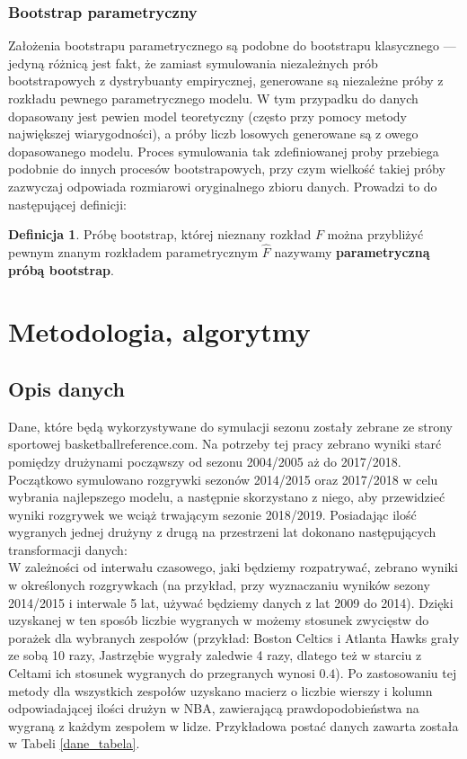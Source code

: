 \documentclass[inzynierska]{pwr_wmat_praca_dyplomowa}
\theoremstyle{plain}
\numberwithin{theorem}{chapter}
\theoremstyle{definition}
\numberwithin{theorem}{chapter}
\newtheorem{definition}[theorem]{Definicja}
\begin{document}
\subsection{Bootstrap parametryczny}
Założenia bootstrapu parametrycznego są podobne do bootstrapu klasycznego --- jedyną różnicą jest fakt, że zamiast symulowania niezależnych prób bootstrapowych z dystrybuanty empirycznej, generowane są niezależne próby z rozkładu pewnego parametrycznego modelu. 
W tym przypadku do danych dopasowany jest pewien model teoretyczny (często przy pomocy metody największej wiarygodności), a próby liczb losowych generowane są z owego dopasowanego modelu. Proces symulowania tak zdefiniowanej proby przebiega podobnie do innych procesów bootstrapowych, przy czym wielkość takiej próby zazwyczaj odpowiada rozmiarowi oryginalnego zbioru danych. Prowadzi to do następującej definicji:
\begin{definition}
	Próbę bootstrap, której nieznany rozkład $F$ można przybliżyć pewnym znanym rozkładem parametrycznym $\hat{F}$ nazywamy \textbf{parametryczną próbą bootstrap}. 
\end{definition}
 
\chapter{Metodologia, algorytmy}\label{rodzial_algorytmy}
\section{Opis danych}
Dane, które będą wykorzystywane do symulacji sezonu zostały zebrane ze strony sportowej basketballreference.com.
Na potrzeby tej pracy zebrano wyniki starć pomiędzy drużynami począwszy od sezonu 2004/2005 aż do 2017/2018. Początkowo symulowano rozgrywki sezonów 2014/2015 oraz 2017/2018 w celu wybrania najlepszego modelu, a następnie skorzystano z niego, aby przewidzieć wyniki rozgrywek we wciąż trwającym sezonie 2018/2019.
Posiadając ilość wygranych jednej drużyny z drugą na przestrzeni lat dokonano następujących transformacji danych:
\\
W zależności od interwału czasowego, jaki będziemy rozpatrywać, zebrano wyniki w określonych rozgrywkach (na przykład, przy wyznaczaniu wyników sezony 2014/2015 i interwale 5 lat, używać będziemy danych z lat 2009 do 2014). Dzięki uzyskanej w ten sposób liczbie wygranych w możemy stosunek zwycięstw do porażek dla wybranych zespołów (przykład: Boston Celtics i Atlanta Hawks grały ze sobą 10 razy, Jastrzębie wygrały zaledwie 4 razy, dlatego też w starciu z Celtami ich stosunek wygranych do przegranych wynosi $0.4$). Po zastosowaniu tej metody dla wszystkich zespołów uzyskano macierz o liczbie wierszy i kolumn odpowiadającej ilości drużyn w NBA, zawierającą prawdopodobieństwa na wygraną z każdym zespołem w lidze. Przykładowa postać danych zawarta została w Tabeli \ref{dane_tabela}.
\end{document}
